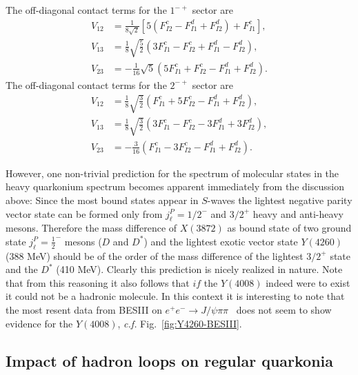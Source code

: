 The off-diagonal contact terms for the $1^{-+}$ sector are 
\begin{equation}
\begin{aligned}
    V_{12}&= \frac{1}{8 \sqrt{2}}\left[5\left(F_{I 2}^{c}-F_{I 1}^{d}+F_{I 2}^{d}\right)+F_{I 1}^{c} \right], \\
    V_{13}&= \frac{1}{8} \sqrt{\frac{5}{2}}\left(3 F_{I 1}^{c}-F_{I 2}^{c}+F_{I 1}^{d}-F_{I 2}^{d}\right), \\
    V_{23}&= -\frac{1}{16} \sqrt{5}\left(5 F_{I 1}^{c}+F_{I 2}^{c}-F_{I 1}^{d}+F_{I 2}^{d}\right).
\end{aligned}
\end{equation}
The off-diagonal contact terms for the $2^{-+}$ sector are 
\begin{equation}
    \begin{aligned}
        V_{12} &= \frac{1}{8} \sqrt{\frac{3}{2}}\left(F_{I 1}^{c}+5 F_{I 2}^{c}-F_{I 1}^{d}+F_{I 2}^{d}\right), \\
        V_{13} &= \frac{1}{8} \sqrt{\frac{3}{2}}\left(3 F_{I 1}^{c}- F_{I 2}^{c}-3 F_{I 1}^{d}+3 F_{I 2}^{d}\right),\\
        V_{23} &= -\frac{3}{16} \left(F_{I 1}^{c}-3 F_{I 2}^{c}-F_{I 1}^{d}+F_{I 2}^{d}\right).
    \end{aligned}
\end{equation}

However, one non-trivial prediction for the spectrum of molecular states in the
heavy quarkonium spectrum becomes apparent immediately from the discussion
above: Since the most bound states appear in $S$-waves  the lightest negative
parity vector state can be formed only from $j_\ell^P=1/2^-$ and $3/2^+$
heavy and anti-heavy mesons.
Therefore the mass difference of $X(3872)$ as bound state of two ground state
$j_\ell^P=\frac12^-$ mesons ($D$ and $D^*$) and the lightest exotic vector state
$Y(4260)$ (388 MeV) should be of the order of the mass difference of the
lightest $3/2^+$ state and the $D^*$ (410 MeV). Clearly this prediction is
nicely realized in nature. Note that from this reasoning it also follows that
$if$ the $Y(4008)$ indeed were to exist it could not be a hadronic molecule. In
this context it is interesting to note that the most resent data from BESIII on
$e^+e^-\to J/\psi\pi\pi$~\cite{Ablikim:2016qzw} does not seem to show evidence
for the $Y(4008)$, {\sl c.f.} Fig.~\ref{fig:Y4260-BESIII}.



\subsection{Impact of hadron loops on regular quarkonia}
\label{sec:4-NREFT_ccbar}

